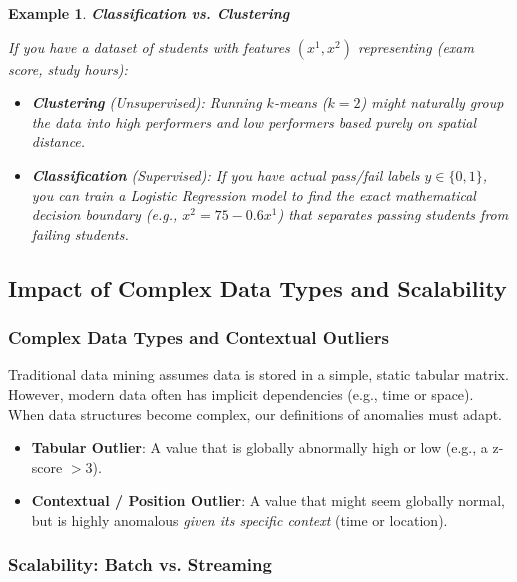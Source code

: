 \documentclass[11pt]{article}
\theoremstyle{smallexample}
\newtheorem{example}{Example}[section]
\newcommand{\vs}{\vspace{0.2\baselineskip}}
\begin{document}
\vs
\begin{example}{\textbf{Classification vs. Clustering}}

    If you have a dataset of students with features $(x^1, x^2)$ representing (exam score, study hours):
    \begin{itemize}
        \item \textbf{Clustering} (Unsupervised): Running $k$-means ($k=2$) might naturally group the data into \textit{high performers} and \textit{low performers} based purely on spatial distance.
        \item \textbf{Classification} (Supervised): If you have actual pass/fail labels $y \in \{0, 1\}$, you can train a Logistic Regression model to find the exact mathematical decision boundary (e.g., $x^2 = 75 - 0.6x^1$) that separates passing students from failing students.
    \end{itemize}
\end{example}

\subsection{Impact of Complex Data Types and Scalability}

\subsubsection{Complex Data Types and Contextual Outliers}

Traditional data mining assumes data is stored in a simple, static tabular matrix. However, modern data often has implicit dependencies (e.g., time or space). When data structures become complex, our definitions of anomalies must adapt.

\begin{itemize}
    \item \textbf{Tabular Outlier}: A value that is globally abnormally high or low (e.g., a z-score $> 3$).
    \item \textbf{Contextual / Position Outlier}: A value that might seem globally normal, but is highly anomalous \textit{given its specific context} (time or location). 
\end{itemize}


\subsubsection{Scalability: Batch vs. Streaming}
\end{document}
